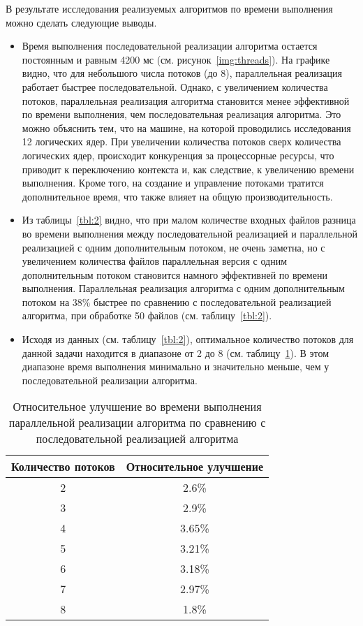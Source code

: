 В результате исследования реализуемых алгоритмов по времени выполнения можно сделать следующие выводы.
\begin{itemize}
\item Время выполнения последовательной реализации алгоритма остается постоянным и равным 4200 мс (см. рисунок~\ref{img:threads}). На графике видно, что для небольшого числа потоков (до 8), параллельная реализация работает быстрее последовательной. Однако, с увеличением количества потоков, параллельная реализация алгоритма становится менее эффективной по времени выполнения, чем последовательная реализация алгоритма. Это можно объяснить тем, что на машине, на которой проводились исследования 12 логических ядер. При увеличении количества потоков сверх количества логических ядер, происходит конкуренция за процессорные ресурсы, что приводит к переключению контекста и, как следствие, к увеличению времени выполнения. Кроме того, на создание и управление потоками тратится дополнительное время, что также влияет на общую производительность. 

\item Из таблицы~\ref{tbl:2} видно, что при малом количестве входных файлов разница во времени выполнения между последовательной реализацией и параллельной реализацией с одним дополнительным потоком, не очень заметна, но с увеличением количества файлов параллельная версия с одним дополнительным потоком становится намного эффективней по времени выполнения.
Параллельная реализация алгоритма с одним дополнительным потоком на 38\% быстрее по сравнению с последовательной реализацией алгоритма, при обработке 50 файлов (см. таблицу~\ref{tbl:2}).

\item Исходя из данных (см. таблицу~\ref{tbl:2}), оптимальное количество потоков для данной задачи находится в диапазоне от 2 до 8 (см. таблицу~\ref{tbl:3}). В этом диапазоне время выполнения минимально и значительно меньше, чем у последовательной реализации алгоритма.
\end{itemize}

\begin{table}[h]
	\centering
	\caption{Относительное улучшение во времени выполнения параллельной реализации алгоритма по сравнению с последовательной реализацией алгоритма}
	\label{tbl:3}
	\begin{tabular}{|c|c|}
		\hline
		Количество потоков & Относительное улучшение\\
		\hline
		2  & 2.6\% \\
		\hline
		3  & 2.9\% \\
		\hline
		4  & 3.65\% \\
		\hline
		5  & 3.21\% \\
		\hline
		6  & 3.18\% \\
		\hline
		7  & 2.97\% \\
		\hline
		8  & 1.8\% \\
		\hline
	\end{tabular}
\end{table}
